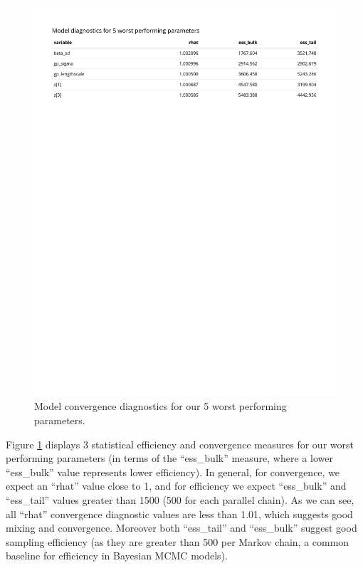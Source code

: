 \documentclass[
]{article}
\begin{document}
\begin{figure}

{\centering \includegraphics[width=1\linewidth]{../outputs/bayesian-analysis-landfall-freq/model-HSGP/HSGP-model-diagnostics} 

}

\caption{Model convergence diagnostics for our 5 worst performing parameters.}\label{fig:figs9}
\end{figure}

Figure \ref{fig:figs9} displays 3 statistical efficiency and convergence measures for our worst performing parameters (in terms of the ``ess\_bulk'' measure, where a lower ``ess\_bulk'' value represents lower efficiency). In general, for convergence, we expect an ``rhat'' value close to 1, and for efficiency we expect ``ess\_bulk'' and ``ess\_tail'' values greater than 1500 (500 for each parallel chain). As we can see, all ``rhat'' convergence diagnostic values are less than 1.01, which suggests good mixing and convergence. Moreover both ``ess\_tail'' and ``ess\_bulk'' suggest good sampling efficiency (as they are greater than 500 per Markov chain, a common baseline for efficiency in Bayesian MCMC models).
\end{document}
